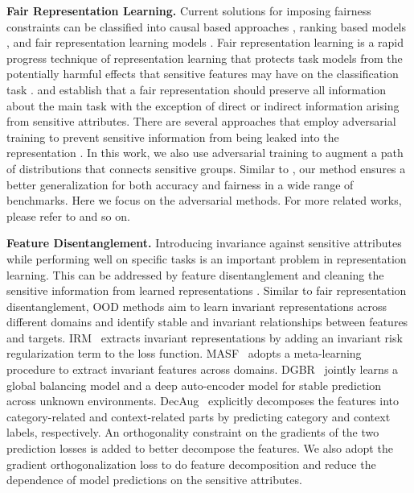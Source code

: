 \noindent\textbf{Fair Representation Learning.}
Current solutions for imposing fairness constraints can be classified into causal based approaches \cite{khademi2019fairness,kusner2017counterfactual}, ranking based models \cite{beutel2019fairness}, and fair representation learning models \cite{bose2019compositional,edwards2015censoring,madras2018learning,Zemellearningfair}. 
Fair representation learning is a rapid progress technique of representation learning that protects task models from the potentially harmful effects that sensitive features may have on the classification task \cite{hardt2016equality,mcnamara2017provably,locatello2019fairness}.
\citet{Zemellearningfair} and \citet{dwork2011fairness} establish that a fair representation should preserve all information about the main task with the exception of direct or indirect information arising from sensitive attributes.
There are several approaches that employ adversarial training \cite{goodfellow2014generative}
to prevent sensitive information from being leaked into the representation \cite{edwards2015censoring,madras2018learning,zhang2018mitigating,xu2018fairgan,feng2019learning}.
In this work, we also use adversarial training to augment a path of distributions that connects sensitive groups. 
Similar to \citet{chuang2021fair}, our method ensures a better generalization for both accuracy and fairness in a wide range of benchmarks.
Here we focus on the adversarial methods. For more related works, please refer to \cite{louizos2015variational,calmon2017optimized,song2019learning,kusner2017counterfactual,joachims2016counterfactual} and so on.



\noindent\textbf{Feature Disentanglement.} 
Introducing invariance against sensitive attributes while performing well on specific tasks is an important problem in representation learning. This can be addressed by feature disentanglement and cleaning the sensitive information from learned representations \cite{sarhan2020fairness,park2021learning,jha2021fair,li2022towards,quadrianto2019discovering}. 
Similar to fair representation disentanglement, OOD methods aim to learn invariant representations across different domains and identify stable and invariant relationships between features and targets. IRM~\cite{arjovsky2019invariant} extracts invariant representations by adding an invariant risk regularization term to the loss function. MASF~\cite{dou2019domain} adopts a meta-learning procedure to extract invariant features across domains. DGBR~\cite{Kuang2018} jointly learns a global balancing model and a deep auto-encoder model for stable prediction across unknown environments. DecAug~\cite{bai2020decaug} explicitly decomposes the features into category-related and context-related parts by predicting category and context labels, respectively. An orthogonality constraint on the gradients of the two prediction losses is added to better decompose the features. We also adopt the gradient orthogonalization loss to do feature decomposition and reduce the dependence of model predictions on the sensitive attributes.
